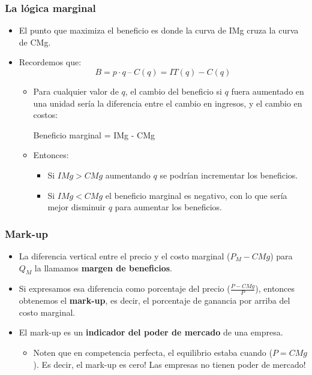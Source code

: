 \documentclass{beamer}
\begin{document}
\begin{frame}
\frametitle{La lógica marginal}
\begin{itemize}
    \item El punto que maximiza el beneficio es donde la curva de IMg cruza la curva de CMg. \vspace{2mm}
    \item Recordemos que: 
     \[ B = p \cdot q \ – \ C(q) = IT(q) - C(q)\] \vspace{-4mm}
        \begin{itemize}
        \item Para cualquier valor de $q$, el cambio del beneficio si $q$ fuera aumentado en una unidad sería la diferencia entre el cambio en ingresos, y el cambio en costos: \vspace{2mm}  
        \begin{center} 
            Beneficio marginal = IMg - CMg 
            \end{center}
        \vspace{2mm}
        \item Entonces: 
         \begin{itemize}
            \item  Si $IMg > CMg$ aumentando $q$ se podrían incrementar los beneficios.
            \item  Si $IMg < CMg$ el beneficio marginal es negativo, con lo que sería mejor disminuir $q$ para aumentar los beneficios.
             \end{itemize}
    \end{itemize}
    \end{itemize}
\end{frame}


\begin{frame}
\frametitle{Mark-up}
\begin{itemize}
    \item La diferencia vertical entre el precio y el costo marginal ($P_M-CMg$) para $Q_M$ la llamamos \textbf{margen de beneficios}. \vspace{1mm}
    \item  Si expresamos esa diferencia como porcentaje del precio ($\frac{P-CMg}{P}$), entonces obtenemos el \textbf{mark-up}, es decir, el porcentaje de ganancia por arriba del costo marginal. \vspace{1mm}
    \item El mark-up es un \textbf{indicador del poder de mercado} de una empresa. 
    \begin{itemize}
        \item  Noten que en competencia perfecta, el equilibrio estaba cuando ($P=CMg$). Es decir, el mark-up es cero! Las empresas no tienen poder de mercado! \vspace{1mm}
    \end{itemize}
    \end{itemize}
\end{frame}
\end{document}
